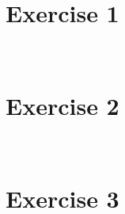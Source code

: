 \documentclass[11pt,a4paper]{article}
\begin{document}
\begin{titlepage}
    \maketitle
\end{titlepage}
\renewcommand{\contentsname}{Contents}
\begin{center} 
    \tableofcontents 
\end{center}
\newpage
\newcommand{\wm}[1]{\ensuremath{w(M_{#1})}}
\newcommand{\wmp}[1]{\ensuremath{w(M'_{#1})}}
\newcommand{\wmi}{\ensuremath{w(M_i)}}
\newcommand{\wmip}{\ensuremath{w(M'_i)}}
\newcommand{\constantTime}{\ensuremath{\mathcal{O}(1)}}
\newcommand{\linearTime}{\ensuremath{\mathcal{O}(n)}}
\newcommand{\lbw}[1]{\ensuremath{a_{#1} q_{#1} + b_{#1}}}  %
\newcommand{\sbw}[1]{\ensuremath{m_{#1}}}
\section{Exercise 1}
\ovalbox{
\begin{minipage}{15cm}
\end{minipage} } \\[0.5cm]

\newpage
\section{Exercise 2}
 \\

\newpage
\section{Exercise 3}
 \\

\end{document}
